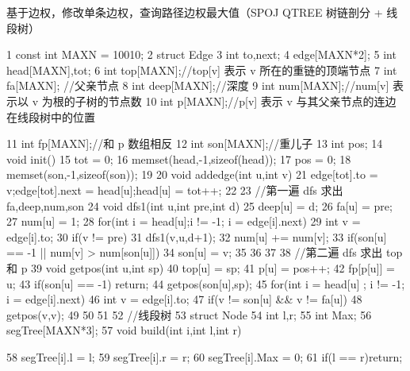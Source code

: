 \documentclass[11pt]{article}
\begin{document}
\begin{Code}
     基于边权，修改单条边权，查询路径边权最大值（SPOJ QTREE 树链剖分 + 线段树）

 1   const int MAXN = 10010;
 2   struct Edge{
 3       int to,next;
 4   }edge[MAXN*2];
 5   int head[MAXN],tot;
 6   int top[MAXN];//top[v] 表示 v 所在的重链的顶端节点
 7   int fa[MAXN]; //父亲节点
 8   int deep[MAXN];//深度
 9   int num[MAXN];//num[v] 表示以 v 为根的子树的节点数
10   int p[MAXN];//p[v] 表示 v 与其父亲节点的连边在线段树中的位置


11   int fp[MAXN];//和 p 数组相反
12   int son[MAXN];//重儿子
13   int pos;
14   void init(){
15       tot = 0;
16       memset(head,-1,sizeof(head));
17       pos = 0;
18       memset(son,-1,sizeof(son));
19   }
20   void addedge(int u,int v){
21       edge[tot].to = v;edge[tot].next = head[u];head[u] = tot++;
22   }
23   //第一遍 dfs 求出 fa,deep,num,son
24   void dfs1(int u,int pre,int d){
25       deep[u] = d;
26       fa[u] = pre;
27       num[u] = 1;
28       for(int i = head[u];i != -1; i = edge[i].next){
29           int v = edge[i].to;
30           if(v != pre){
31                dfs1(v,u,d+1);
32                num[u] += num[v];
33                if(son[u] == -1 || num[v] > num[son[u]])
34                    son[u] = v;
35           }
36       }
37   }
38   //第二遍 dfs 求出 top 和 p
39   void getpos(int u,int sp){
40       top[u] = sp;
41       p[u] = pos++;
42       fp[p[u]] = u;
43       if(son[u] == -1) return;
44       getpos(son[u],sp);
45       for(int i = head[u] ; i != -1; i = edge[i].next){
46           int v = edge[i].to;
47           if(v != son[u] && v != fa[u])
48                getpos(v,v);
49       }
50   }
51
52   //线段树
53   struct Node{
54       int l,r;
55       int Max;
56   }segTree[MAXN*3];
57   void build(int i,int l,int r){
58       segTree[i].l = l;
59       segTree[i].r = r;
60       segTree[i].Max = 0;
61       if(l == r)return;


}
\end{Code}
\end{document}
